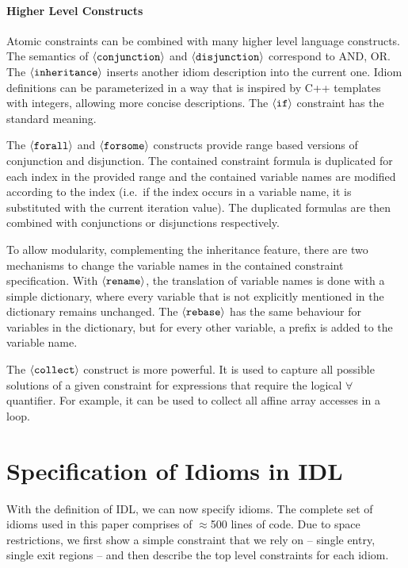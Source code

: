     \paragraph{Higher Level Constructs}
    Atomic constraints can be combined with many higher level language
    constructs.
    The semantics of $\left<\text{\tt conjunction}\right>$ and $\left<\text{\tt disjunction}\right>$ correspond to AND, OR.
    The $\left<\text{\tt inheritance}\right>$ inserts another idiom description
    into the current one.
    Idiom definitions can be parameterized in a way that is inspired by C++
    templates with integers, allowing more concise descriptions.
    The $\left<\text{\tt if}\right>$ constraint has the standard meaning.

    The $\left<\text{\tt forall}\right>$ and $\left<\text{\tt forsome}\right>$
    constructs provide range based versions of conjunction and disjunction.
    The contained constraint formula is duplicated for each index in the
    provided range and the contained variable names are modified according to
    the index (i.e.\ if the index occurs in a variable name, it is substituted
    with the current iteration value).
    The duplicated formulas are then combined with conjunctions or disjunctions
    respectively.

    To allow modularity, complementing the inheritance feature, there are two
    mechanisms to change the variable names in the contained constraint
    specification.
    With $\left<\text{\tt rename}\right>$, the translation of variable names is
    done with a simple dictionary, where every variable that is not explicitly
    mentioned in the dictionary remains unchanged.
    The $\left<\text{\tt rebase}\right>$ has the same behaviour for variables in
    the dictionary, but for every other variable, a prefix is added to the
    variable name.

    The $\left<\text{\tt collect}\right>$ construct is more powerful.
    It is used to capture all possible solutions of a given constraint for
    expressions that require the logical $\forall$ quantifier.
    For example, it can be used to collect all affine array accesses in a loop.

\section{Specification of Idioms in IDL}
\label{sec:idioms}

    With the definition of IDL, we can now specify idioms.
    The complete set of idioms used in this paper comprises of $\approx$500
    lines of code.
    Due to space restrictions, we first show a simple constraint that we rely
    on -- single entry, single exit regions -- and then describe the top level
    constraints for each idiom.

